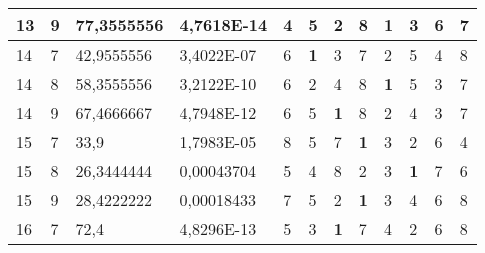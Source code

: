 \documentclass[conference]{IEEEtran}
\begin{document}
\begin{table*}[]
\begin{tabular}{|llll|llllllll|}
		\multicolumn{1}{|l|}{13} & \multicolumn{1}{l|}{9} & \multicolumn{1}{l|}{77,3555556} & 4,7618E-14 & \multicolumn{1}{l|}{4} & \multicolumn{1}{l|}{5} & \multicolumn{1}{l|}{2} & \multicolumn{1}{l|}{8} & \multicolumn{1}{l|}{\textbf{1}} & \multicolumn{1}{l|}{3} & \multicolumn{1}{l|}{6} & 7 \\ \hline
		\multicolumn{1}{|l|}{14} & \multicolumn{1}{l|}{7} & \multicolumn{1}{l|}{42,9555556} & 3,4022E-07 & \multicolumn{1}{l|}{6} & \multicolumn{1}{l|}{\textbf{1}} & \multicolumn{1}{l|}{3} & \multicolumn{1}{l|}{7} & \multicolumn{1}{l|}{2} & \multicolumn{1}{l|}{5} & \multicolumn{1}{l|}{4} & 8 \\ \hline
		\multicolumn{1}{|l|}{14} & \multicolumn{1}{l|}{8} & \multicolumn{1}{l|}{58,3555556} & 3,2122E-10 & \multicolumn{1}{l|}{6} & \multicolumn{1}{l|}{2} & \multicolumn{1}{l|}{4} & \multicolumn{1}{l|}{8} & \multicolumn{1}{l|}{\textbf{1}} & \multicolumn{1}{l|}{5} & \multicolumn{1}{l|}{3} & 7 \\ \hline
		\multicolumn{1}{|l|}{14} & \multicolumn{1}{l|}{9} & \multicolumn{1}{l|}{67,4666667} & 4,7948E-12 & \multicolumn{1}{l|}{6} & \multicolumn{1}{l|}{5} & \multicolumn{1}{l|}{\textbf{1}} & \multicolumn{1}{l|}{8} & \multicolumn{1}{l|}{2} & \multicolumn{1}{l|}{4} & \multicolumn{1}{l|}{3} & 7 \\ \hline
		\multicolumn{1}{|l|}{15} & \multicolumn{1}{l|}{7} & \multicolumn{1}{l|}{33,9} & 1,7983E-05 & \multicolumn{1}{l|}{8} & \multicolumn{1}{l|}{5} & \multicolumn{1}{l|}{7} & \multicolumn{1}{l|}{\textbf{1}} & \multicolumn{1}{l|}{3} & \multicolumn{1}{l|}{2} & \multicolumn{1}{l|}{6} & 4 \\ \hline
		\multicolumn{1}{|l|}{15} & \multicolumn{1}{l|}{8} & \multicolumn{1}{l|}{26,3444444} & 0,00043704 & \multicolumn{1}{l|}{5} & \multicolumn{1}{l|}{4} & \multicolumn{1}{l|}{8} & \multicolumn{1}{l|}{2} & \multicolumn{1}{l|}{3} & \multicolumn{1}{l|}{\textbf{1}} & \multicolumn{1}{l|}{7} & 6 \\ \hline
		\multicolumn{1}{|l|}{15} & \multicolumn{1}{l|}{9} & \multicolumn{1}{l|}{28,4222222} & 0,00018433 & \multicolumn{1}{l|}{7} & \multicolumn{1}{l|}{5} & \multicolumn{1}{l|}{2} & \multicolumn{1}{l|}{\textbf{1}} & \multicolumn{1}{l|}{3} & \multicolumn{1}{l|}{4} & \multicolumn{1}{l|}{6} & 8 \\ \hline
		\multicolumn{1}{|l|}{16} & \multicolumn{1}{l|}{7} & \multicolumn{1}{l|}{72,4} & 4,8296E-13 & \multicolumn{1}{l|}{5} & \multicolumn{1}{l|}{3} & \multicolumn{1}{l|}{\textbf{1}} & \multicolumn{1}{l|}{7} & \multicolumn{1}{l|}{4} & \multicolumn{1}{l|}{2} & \multicolumn{1}{l|}{6} & 8 \\ \hline

\end{tabular}
\end{table*}
\end{document}
